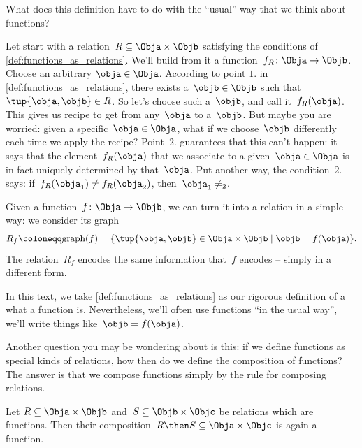 What does this definition have to do with the ``usual'' way that we think about functions?

Let start with a relation~$R \subseteq \Obja \times \Objb$ satisfying the conditions of \cref{def:functions_as_relations}.  We'll build from it a function~$f_R \colon \Obja \to \Objb$. Choose an arbitrary $\obja \in \Obja$. According to point $1.$ in \cref{def:functions_as_relations}, there exists a~$\objb \in \Objb$ such that~$\tup{\obja,\objb} \in R$. So let's choose such a~$\objb$, and call it~$f_R(\obja)$. This gives us recipe to get from any~$\obja$ to a~$\objb$. But maybe you are worried: given a specific~$\obja \in \Obja$, what if we choose~$\objb$ differently each time we apply the recipe? Point~$2.$ guarantees that this can't happen: it says that the element~$f_R(\obja)$ that we associate to a given~$\obja \in \Obja$ is in fact uniquely determined by that~$\obja$. Put another way, the condition~$2.$ says: if~$f_R(\obja_1) \neq f_R(\obja_2)$, then~$\obja_1 \neq _2$.

Given a function~$f \colon \Obja \rightarrow \Objb$, we can turn it into a relation in a simple way: we consider its graph
\begin{equation*}
R_f \coloneqq \text{graph}(f) = \{ \tup{\obja,\objb} \in \Obja \times \Objb \mid \objb= f(\obja) \}.
\end{equation*}
The relation~$R_f$ encodes the same information that~$f$ encodes -- simply in a different form.

In this text, we take \cref{def:functions_as_relations} as our rigorous definition of a what a function is. Nevertheless, we'll often use functions ``in the usual way'',  we'll write things like~$\objb = f(\obja)$.

Another question you may be wondering about is this: if we define functions as special kinds of relations, how then do we define the composition of functions? The answer is that we compose functions simply by the rule for composing relations.

\begin{lemma}
\label{lemma:comprelfun}
Let $R \subseteq \Obja \times \Objb$ and~$S \subseteq \Objb \times \Objc$ be relations which are functions. Then their composition~$R \then S \subseteq \Obja \times \Objc$ is again a function.
\end{lemma}

